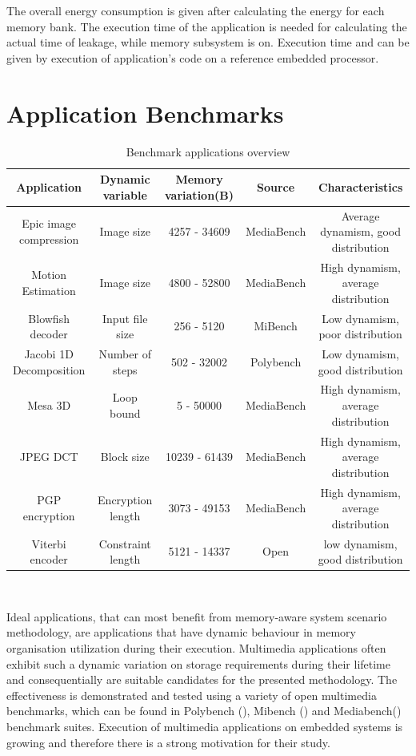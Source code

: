 \documentclass[a4paper,conference]{IEEEtran}
\begin{document}
 The overall energy consumption is given after calculating the energy for each memory bank. The execution time of the application is needed for calculating the actual time of leakage, while memory subsystem is on. Execution time and can be given by execution of application's code on a reference embedded processor.   
 
\section{Application Benchmarks}
\label{sec:applications}

\begin{center}
\begin{table}[!t]
\caption{Benchmark applications overview}
\label{tab:applications}
{\small
\hfill{}
\begin{tabular}{|c|c|c|c|c|}
\hline 
\textbf{Application} & \textbf{Dynamic variable} & \textbf{Memory variation(B)} & \textbf{Source} & \textbf{Characteristics}\\ 
\hline 
Epic image compression & Image size & 4257 - 34609 & MediaBench & Average dynamism, good distribution\\ 
\hline 
Motion Estimation & Image size & 4800 - 52800 & MediaBench & High dynamism, average distribution\\ 
\hline 
Blowfish decoder & Input file size & 256 - 5120 & MiBench & Low dynamism, poor distribution\\ 
\hline 
Jacobi 1D Decomposition & Number of steps & 502 - 32002 & Polybench & Low dynamism, good distribution\\ 
\hline 
Mesa 3D & Loop bound & 5 - 50000 & MediaBench & High dynamism, average distribution\\ 
\hline 
JPEG DCT & Block size & 10239 - 61439 & MediaBench & High dynamism, average distribution\\ 
\hline 
PGP encryption & Encryption length & 3073 - 49153 & MediaBench & High dynamism, average distribution\\ 
\hline 
Viterbi encoder & Constraint length & 5121 - 14337 & Open & low dynamism, good distribution\\ 
\hline 
\end{tabular}}
\hfill{}
\\
\end{table}
\end{center}

Ideal applications, that can most benefit from memory-aware system scenario methodology, are applications that have dynamic behaviour in memory organisation utilization during their execution. Multimedia applications often exhibit such a dynamic variation on storage requirements during their lifetime and consequentially are suitable candidates for the presented methodology. The effectiveness is demonstrated and tested using a variety of open multimedia benchmarks, which can be found in Polybench (\cite{Poly}), Mibench (\cite{mibench}) and Mediabench(\cite{mediabench}) benchmark suites. Execution of multimedia applications on embedded systems is growing and therefore there is a strong motivation for their study.
\end{document}
